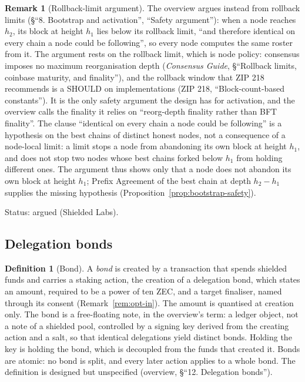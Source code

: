 \documentclass[11pt,a4paper]{article}
\theoremstyle{definition}
\newtheorem{definition}[theorem]{Definition}
\newtheorem{remark}[theorem]{Remark}
\begin{document}
\begin{remark}[Rollback-limit argument]\label{rem:bootstrap-rollback}
The overview argues instead from rollback limits (\S``8. Bootstrap and
activation'', ``Safety argument''): when a node reaches $h_2$, its block at
height $h_1$ lies below its rollback limit, ``and therefore identical on every
chain a node could be following'', so every node computes the same roster from
it. The argument rests on the rollback limit, which is node policy: consensus
imposes no maximum reorganisation depth (\emph{Consensus Guide}, \S``Rollback
limits, coinbase maturity, and finality''), and the rollback window that
ZIP 218 recommends is a SHOULD on implementations (ZIP 218,
``Block-count-based constants''). It is the only safety argument the design
has for activation, and the overview calls the finality it relies on
``reorg-depth finality rather than BFT finality''. The clause ``identical on
every chain a node could be following'' is a hypothesis on the best chains
of distinct honest nodes, not a consequence of a node-local limit: a limit
stops a node from abandoning its own block at height $h_1$, and does not
stop two nodes whose best chains forked below $h_1$ from holding different
ones. The argument thus shows only that a node does not abandon its own
block at height $h_1$; Prefix Agreement of the best chain at depth
$h_2 - h_1$ supplies the missing hypothesis
(Proposition~\ref{prop:bootstrap-safety}).

Status: argued (Shielded Labs).
\end{remark}

\subsection{Delegation bonds}\label{sec:fs-bonds}

\begin{definition}[Bond]\label{def:bond}
A \emph{bond} is created by a transaction that spends shielded funds and
carries a staking action, the creation of a delegation bond, which states an
amount, required to be a power of ten ZEC, and a target finaliser, named
through its consent (Remark~\ref{rem:opt-in}). The amount is quantised at
creation only. The bond is a free-floating note, in the overview's term: a
ledger object, not a note of a shielded pool, controlled by a signing key
derived from the creating action and a salt, so that identical delegations
yield distinct bonds. Holding the key is holding the bond, which is
decoupled from the funds that created it. Bonds are atomic: no bond is
split, and every later action applies to a whole bond. The definition is
designed but unspecified (overview, \S``12. Delegation bonds'').
\end{definition}
\end{document}

